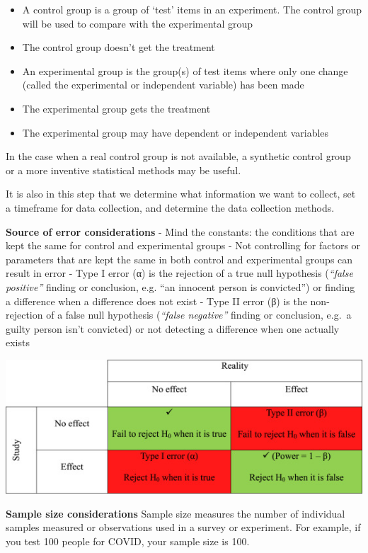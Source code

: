 \documentclass[]{book}
\providecommand{\tightlist}{%
  \setlength{\itemsep}{0pt}\setlength{\parskip}{0pt}}
\begin{document}
\begin{itemize}
\tightlist
\item
  A control group is a group of `test' items in an experiment. The control group will be used to compare with the experimental group
\item
  The control group doesn't get the treatment
\item
  An experimental group is the group(s) of test items where only one change (called the experimental or independent variable) has been made
\item
  The experimental group gets the treatment
\item
  The experimental group may have dependent or independent variables
\end{itemize}

In the case when a real control group is not available, a synthetic control group or a more inventive statistical methods may be useful.

It is also in this step that we determine what information we want to collect, set a timeframe for data collection, and determine the data collection methods.

\textbf{Source of error considerations}
- Mind the constants: the conditions that are kept the same for control and experimental groups
- Not controlling for factors or parameters that are kept the same in both control and experimental groups can result in error
- Type I error (α) is the rejection of a true null hypothesis (\emph{``false positive''} finding or conclusion, e.g. ``an innocent person is convicted'') or finding a difference when a difference does not exist
- Type II error (β) is the non-rejection of a false null hypothesis (\emph{``false negative''} finding or conclusion, e.g.~a guilty person isn't convicted) or not detecting a difference when one actually exists

\includegraphics{fig/null.jpg}

\textbf{Sample size considerations}
Sample size measures the number of individual samples measured or observations used in a survey or experiment. For example, if you test 100 people for COVID, your sample size is 100.
\end{document}
